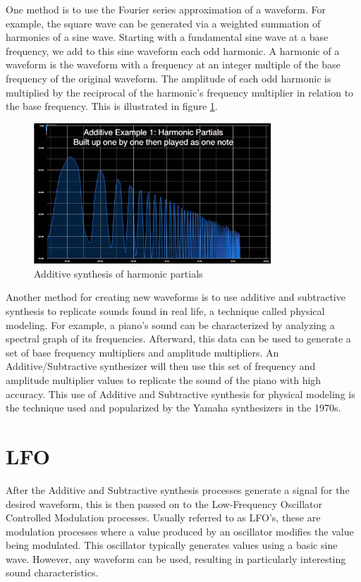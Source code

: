 \documentclass[a4paper,12pt]{report}
\begin{document}
One method is to use the Fourier series approximation of a waveform. For example, the square wave can be generated via a weighted summation of harmonics of a sine wave. Starting with a fundamental sine wave at a base frequency, we add to this sine waveform each odd harmonic. A harmonic of a waveform is the waveform with a frequency at an integer multiple of the base frequency of the original waveform. The amplitude of each odd harmonic is multiplied by the reciprocal of the harmonic's frequency multiplier in relation to the base frequency. This is illustrated in figure \ref{fig:AdditiveSynthesisbyHarmonics}.

\begin{figure}
    \centering
    \includegraphics[width=24em]{AdditiveSynthesisbyHarmonics.jpg}
    \caption{Additive synthesis of harmonic partials}
    \label{fig:AdditiveSynthesisbyHarmonics}
\end{figure}

Another method for creating new waveforms is to use additive and subtractive synthesis to replicate sounds found in real life, a technique called physical modeling. For example, a piano's sound can be characterized by analyzing a spectral graph of its frequencies. Afterward, this data can be used to generate a set of base frequency multipliers and amplitude multipliers. An Additive/Subtractive synthesizer will then use this set of frequency and amplitude multiplier values to replicate the sound of the piano with high accuracy. This use of Additive and Subtractive synthesis for physical modeling is the technique used and popularized by the Yamaha synthesizers in the 1970s.

\section{LFO}
\label{sec:lfo}
After the Additive and Subtractive synthesis processes generate a signal for the desired waveform, this is then passed on to the Low-Frequency Oscillator Controlled Modulation processes. Usually referred to as LFO's, these are modulation processes where a value produced by an oscillator modifies the value being modulated. This oscillator typically generates values using a basic sine wave. However, any waveform can be used, resulting in particularly interesting sound characteristics.
\end{document}
